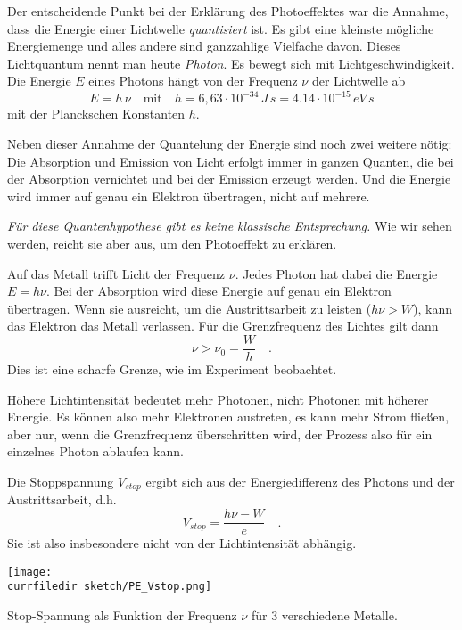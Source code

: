 Der entscheidende Punkt bei der Erklärung des Photoeffektes war die Annahme, dass die Energie einer Lichtwelle \emph{quantisiert} ist. Es gibt eine kleinste mögliche Energiemenge und alles andere sind ganzzahlige Vielfache davon. Dieses Lichtquantum nennt man heute \emph{Photon}. Es bewegt sich mit Lichtgeschwindigkeit.  Die Energie $E$ eines Photons hängt von der Frequenz $\nu$ der Lichtwelle ab
\begin{equation}
    E = h \, \nu \quad \text{mit} \quad h = 6,63 \cdot 10^{-34} \, J \, s = 4.14 \cdot 10^{-15}\, eV \, s
\end{equation}
mit der Planckschen Konstanten $h$. 

Neben dieser Annahme der Quantelung der Energie sind noch zwei weitere nötig: Die Absorption und Emission von Licht erfolgt immer in ganzen Quanten, die bei der Absorption vernichtet und bei der Emission erzeugt werden. Und die Energie wird immer auf genau ein Elektron übertragen, nicht auf mehrere.

\emph{Für diese Quantenhypothese gibt es keine klassische Entsprechung.} Wie wir sehen werden, reicht sie aber aus, um den Photoeffekt zu erklären.

Auf das Metall trifft Licht der Frequenz $\nu$. Jedes Photon hat dabei die Energie $E = h \nu$. Bei der Absorption wird diese Energie auf genau ein Elektron übertragen. Wenn sie ausreicht, um die Austrittsarbeit zu leisten ($h \nu > W$), kann das Elektron das Metall verlassen. Für die Grenzfrequenz des Lichtes gilt dann
 \begin{equation}
     \nu > \nu_0 = \frac{W}{h} \quad .
 \end{equation}
 Dies ist eine scharfe Grenze, wie im Experiment beobachtet.

 Höhere Lichtintensität bedeutet mehr Photonen, nicht Photonen mit höherer Energie. Es können also mehr Elektronen austreten, es kann mehr Strom fließen, aber nur, wenn die Grenzfrequenz überschritten wird, der Prozess also für ein einzelnes Photon ablaufen kann.

 Die Stoppspannung $V_{stop}$ ergibt sich aus der Energiedifferenz des Photons und der Austrittsarbeit, d.h. 
 \begin{equation}
     V_{stop} = \frac{h \nu - W}{e} \quad .
 \end{equation}
 Sie ist also insbesondere nicht von der Lichtintensität abhängig.

 \begin{marginfigure}
    \texttt{[image: \\currfiledir sketch/PE\_Vstop.png]}
    \caption{Stop-Spannung als Funktion der Frequenz $\nu$ für 3 verschiedene Metalle.}
\end{marginfigure}


